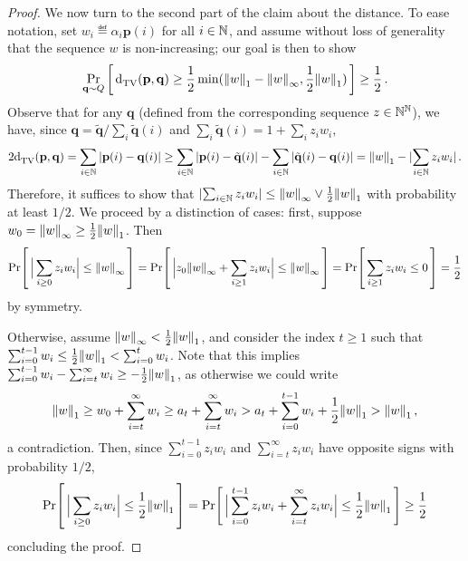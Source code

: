 \documentclass[10pt]{article}
\newcommand{\p}{\mathbf{p}}
\newcommand{\q}{\mathbf{q}}
\begin{document}
\begin{proof}
We now turn to the second part of the claim about the distance. To ease notation, set $w_i \eqdef \alpha_i\p(i)$ for all $i\in\mathbb{N}$, and assume without loss of generality that the sequence $w$ is non-increasing; our goal is then to show 
\[
    \probaDistrOf{\q\sim Q}{ \totalvardist{\p}{\q} \geq \frac{1}{2}\min( \normone{w} - \norminf{w}, \frac{1}{2}\normone{w}) } \geq \frac{1}{2}\,.
\] 
Observe that for any $\q$ (defined from the corresponding sequence $z\in\mathbb{N}^{\mathbb{N}}$), we have, since $\q = \tilde{\q}/\sum_i \tilde{\q}(i)$ and $\sum_i \tilde{\q}(i) = 1+\sum_{i} z_iw_i$,
\begin{equation}
    2\totalvardist{\p}{\q} = \sum_{i\in\N} \abs{ \p(i) - \q(i) } \geq \sum_{i\in\N} \abs{ \p(i) - \tilde{\q}(i) } - \sum_{i\in\N} \abs{ \tilde{\q}(i) - \q(i) }
    = \normone{w} - \dabs{\sum_{i\in\N} z_iw_i}\,.
\end{equation}
Therefore, it suffices to show that $\lvert \sum_{i\in\mathbb{N}} z_i w_i \rvert \leq {\lVert w{\rVert}}_\infty \lor \frac{1}{2}{\lVert w{\rVert}}_1$ with probability at least $1/2$. We proceed by a distinction of cases: first, suppose $w_0 = {\lVert w{\rVert}}_\infty \geq \frac{1}{2}{\lVert w{\rVert}}_1$. Then 
\[
    \Pr\!\left[\,  \Big| \sum_{i\geq 0} z_i w_i \Big| \leq {\lVert w{\rVert}}_\infty \, \right] = \Pr\!\left[\,  \Big| z_0{\lVert w{\rVert}}_\infty + \sum_{i\geq 1} z_i w_i \Big| \leq {\lVert w{\rVert}}_\infty \, \right] = 
    \Pr\!\left[\,  \sum_{i\geq 1} z_i w_i \leq 0 \, \right] = \frac{1}{2}
\]
by symmetry.

 Otherwise, assume ${\lVert w{\rVert}}_\infty < \frac{1}{2}{\lVert w{\rVert}}_1$, and consider the index $t\geq 1$ such that $\sum_{i=0}^{t-1} w_i \leq \frac{1}{2}{\lVert w{\rVert}}_1 < \sum_{i=0}^{t} w_i$. Note that this implies $\sum_{i=0}^{t-1} w_i-\sum_{i=t}^{\infty} w_i \geq -\frac{1}{2}{\lVert w{\rVert}}_1$, as otherwise we could write
 \[
    {\lVert w{\rVert}}_1 \geq w_0 + \sum_{i=t}^{\infty} w_i \geq a_t + \sum_{i=t}^{\infty} w_i > a_t + \sum_{i=0}^{t-1} w_i + \frac{1}{2}{\lVert w{\rVert}}_1 > {\lVert w{\rVert}}_1\,,
\]
 a contradiction. Then, since $\sum_{i=0}^{t-1} z_i w_i$ and $\sum_{i=t}^\infty z_i w_i$ have opposite signs with probability $1/2$,
 \[
    \Pr\!\left[\,  \Big| \sum_{i\geq 0} z_i w_i \Big| \leq \frac{1}{2}{\lVert w{\rVert}}_1 \, \right] = \Pr\!\left[\,  \Big| \sum_{i=0}^{t-1} z_i w_i + \sum_{i=t}^\infty z_i w_i \Big| \leq \frac{1}{2}{\lVert w{\rVert}}_1 \, \right] \geq \frac{1}{2}
\]
concluding the proof.
\end{proof}
\end{document}
